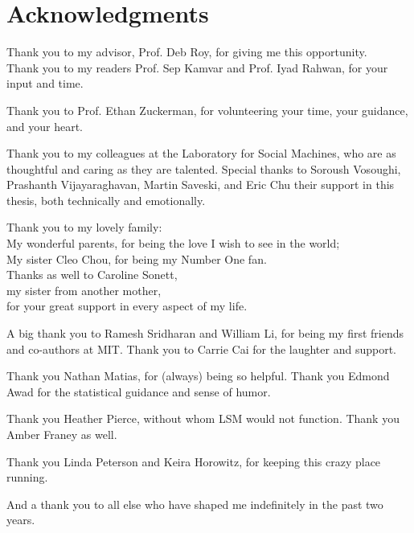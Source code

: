  
\section*{Acknowledgments}

Thank you to my advisor, Prof. Deb Roy, for giving me this opportunity.\\
Thank you to my readers Prof. Sep Kamvar and Prof. Iyad Rahwan, for your input and time.

Thank you to Prof. Ethan Zuckerman, for volunteering your time, your guidance, and your heart. 

Thank you to my colleagues at the Laboratory for Social Machines, who are as thoughtful and caring as they are talented. Special thanks to Soroush Vosoughi, Prashanth Vijayaraghavan, Martin Saveski, and Eric Chu their support in this thesis, both technically and emotionally.

Thank you to my lovely family: \\
My wonderful parents, for being the love I wish to see in the world;  \\
My sister Cleo Chou, for being my Number One fan.  \\
Thanks as well to Caroline Sonett, \\
my sister from another mother, \\
for your great support in every aspect of my life.
  
A big thank you to Ramesh Sridharan and William Li, for being my first friends and co-authors at MIT. Thank you to Carrie Cai for the laughter and support.

Thank you Nathan Matias, for (always) being so helpful. Thank you Edmond Awad for the statistical guidance and sense of humor.

Thank you Heather Pierce, without whom LSM would not function. Thank you Amber Franey as well.

Thank you Linda Peterson and Keira Horowitz, for keeping this crazy place running.

And a thank you to all else who have shaped me indefinitely in the past two years.

 
\afterpage{\blankpage}


